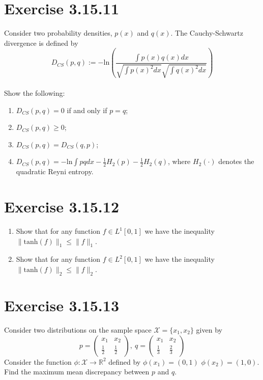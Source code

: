 \documentclass{exam}
\begin{document}
\section*{Exercise 3.15.11}
Consider two probability densities, $p(x)$ and $q(x)$. The Cauchy-Schwartz divergence is defined by 
\begin{equation*}
    D_{CS}(p,q) := -\text{ln}(\displaystyle\frac{\int p(x) q(x) d x}{\sqrt{\int p(x)^2 d x } \sqrt{\int q(x)^2 d x }})
\end{equation*}\\
Show the following: 
\begin{enumerate}
    \item $D_{CS}(p,q) = 0$ if and only if $p = q$;
    \item $D_{CS}(p,q) \geq 0$;
    \item $D_{CS}(p,q) = D_{CS}(q,p)$;
    \item $D_{CS}(p,q) = \displaystyle-\text{ln}\int pq d x  - \frac{1}{2}H_2(p) - \frac{1}{2}H_2(q)$, where $H_2(\cdot)$ denotes the quadratic Reyni entropy.
\end{enumerate}

\section*{Exercise 3.15.12}
\begin{enumerate}
    \item Show that for any function $f \in L^{1}[0,1]$ we have the inequality $\lVert \text{tanh}(f) \rVert_{1} \leq \lVert f \rVert_{1}$.
    \item Show that for any function $f \in L^{2} [0,1]$ we have the inequality $\lVert \text{tanh}(f) \rVert_{2} \leq \lVert f \rVert_{2}$.
\end{enumerate}

\section*{Exercise 3.15.13}
Consider two distributions on the sample space $\mathcal{X} = \{ x_1, x_2\}$ given by 
\begin{equation*}
    p = \begin{pmatrix}
        x_1 & x_2 \\
        \frac{1}{2} & \frac{1}{2}
        \end{pmatrix}, \ q = \begin{pmatrix}
            x_1 & x_2\\
            \frac{1}{3} & \frac{2}{3}
            \end{pmatrix}
\end{equation*}
Consider the function $\phi: \mathcal{X} \to \mathbb{R}^2$ defined by $\phi(x_1) = (0,1)$ $\phi(x_2) = (1,0)$. Find the maximum mean discrepancy between $p$ and $q$.
\end{document}
